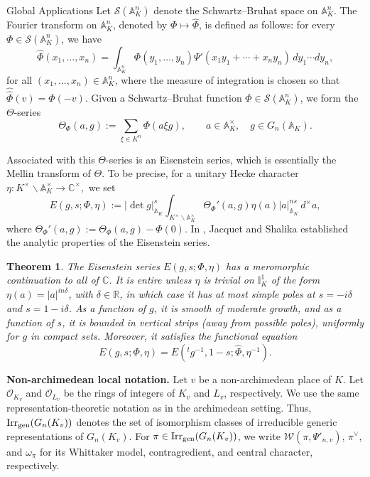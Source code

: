\documentclass[12pt,reqno]{amsart}
\numberwithin{equation}{section}%
\numberwithin{equation}{subsection}
\newtheorem{thm}[equation]{Theorem}%
\theoremstyle{definition}
\theoremstyle{remark}
\begin{document}
\begin{section}{Global Applications}
Let \(\mathcal{S}(\mathbb{A}_K^n)\) denote
the Schwartz--Bruhat space on \(\mathbb{A}_K^n\). The Fourier transform on
\(\mathbb{A}_K^n\), denoted by \(\Phi\mapsto\widehat{\Phi}\), is defined as
follows: for every \(\Phi\in\mathcal{S}(\mathbb{A}_K^n)\), we have
\[
  \widehat{\Phi}(x_1,\ldots,x_n)
  =
  \int_{\mathbb{A}_K^n}
  \Phi(y_1,\ldots,y_n)
  \Psi'(x_1y_1+\cdots+x_ny_n)\,dy_1\cdots dy_n,
\]
for all \((x_1,\ldots,x_n)\in\mathbb{A}_K^n\), where the measure of
integration is chosen so that
\(\widehat{\widehat{\Phi}}(v)=\Phi(-v)\). Given a Schwartz--Bruhat function
\(\Phi\in\mathcal{S}(\mathbb{A}_K^n)\), we form the \(\Theta\)-series
\[
  \Theta_\Phi(a,g)
  :=
  \sum_{\xi\in K^n}\Phi(a\xi g),
  \qquad
  a\in\mathbb{A}_K^\times,
  \quad
  g\in G_n(\mathbb{A}_K).
\]

Associated with this \(\Theta\)-series is an Eisenstein series, which is
essentially the Mellin transform of \(\Theta\). To be precise, for a unitary
Hecke character $\eta:K^\times\backslash\mathbb{A}_K^\times\longrightarrow\mathbb{C}^\times,$
we set
\[
  E(g,s;\Phi,\eta)
  :=
  \lvert\det g\rvert_{\mathbb{A}_K}^{s}
  \int_{K^\times\backslash\mathbb{A}_K^\times}
  \Theta_\Phi'(a,g)\eta(a)
  \lvert a\rvert_{\mathbb{A}_K}^{ns}\,d^\times a,
\]
where $\Theta_\Phi'(a,g):=\Theta_\Phi(a,g)-\Phi(0).
$
In \cite{JS1981}, Jacquet and Shalika established the analytic properties of the
Eisenstein series.

\begin{thm}
The Eisenstein series \(E(g,s;\Phi,\eta)\) has a meromorphic continuation to
all of \(\mathbb{C}\). It is entire unless \(\eta\) is trivial on
\(\mathbb{I}_K^1\) of the form
\(\eta(a)=\lvert a\rvert^{in\delta}\), with \(\delta\in\mathbb{R}\), in
which case it has at most simple poles at \(s=-i\delta\) and
\(s=1-i\delta\). As a function of \(g\), it is smooth of moderate growth,
and as a function of \(s\), it is bounded in vertical strips (away from
possible poles), uniformly for \(g\) in compact sets. Moreover, it satisfies
the functional equation
\[
  E(g,s;\Phi,\eta)
  =
  E({}^{t}g^{-1},1-s;\widehat{\Phi},\eta^{-1}).
\]
\end{thm}

\noindent\textbf{Non-archimedean local notation.}
Let \(v\) be a non-archimedean place of \(K\). Let \(\mathcal{O}_{K_v}\) and \(\mathcal{O}_{L_v}\) be the rings of integers of \(K_v\) and \(L_v\), respectively. We use the same representation-theoretic
notation as in the archimedean setting. Thus,
\({\rm Irr}_{\mathrm{gen}}(G_n(K_v))\) denotes the set of isomorphism classes
of irreducible generic representations of \(G_n(K_v)\). For
\(\pi\in{\rm Irr}_{\mathrm{gen}}(G_n(K_v))\), we write
\(\mathcal{W}(\pi,\Psi'_{n,v})\), \({\pi}^\vee\), and
\(\omega_\pi\) for its Whittaker model, contragredient, and central
character, respectively.


\end{section}
\end{document}

